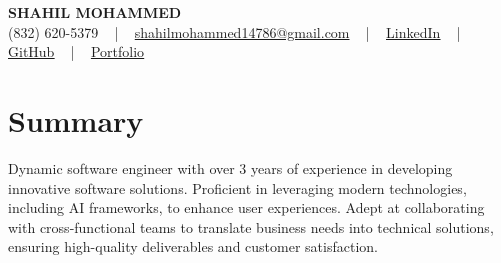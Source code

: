 \documentclass[letterpaper,10pt]{article}
\begin{document}
\begin{center}
    {\fontsize{14pt}{12pt}\selectfont \textbf{\MakeUppercase{Shahil Mohammed}}}\\ \vspace{2pt}
    \fontsize{10pt}{12pt}\selectfont (832) 620-5379 ~ | ~ \href{mailto:shahilmohammed14786@gmail.com}{shahilmohammed14786@gmail.com} ~ | ~  
    \href{https://www.linkedin.com/in/shahil-mohammed-9652931a1/}{\color{blue}\underline{LinkedIn}}  ~ | ~ 
    \href{https://github.com/freakbeast14}{\color{blue}\underline{GitHub}} ~ | ~ 
    \href{https://shahil-mohammed.netlify.app/}{\color{blue}\underline{Portfolio}}
    \vspace{-8pt}
\end{center}

\section{Summary}
\vspace{-2pt}\fontsize{8pt}{9pt}\selectfont
Dynamic software engineer with over 3 years of experience in developing innovative software solutions. Proficient in leveraging modern technologies, including AI frameworks, to enhance user experiences. Adept at collaborating with cross-functional teams to translate business needs into technical solutions, ensuring high-quality deliverables and customer satisfaction. 
 \vspace{-5pt}
 
\vspace{-2pt}
\end{document}
